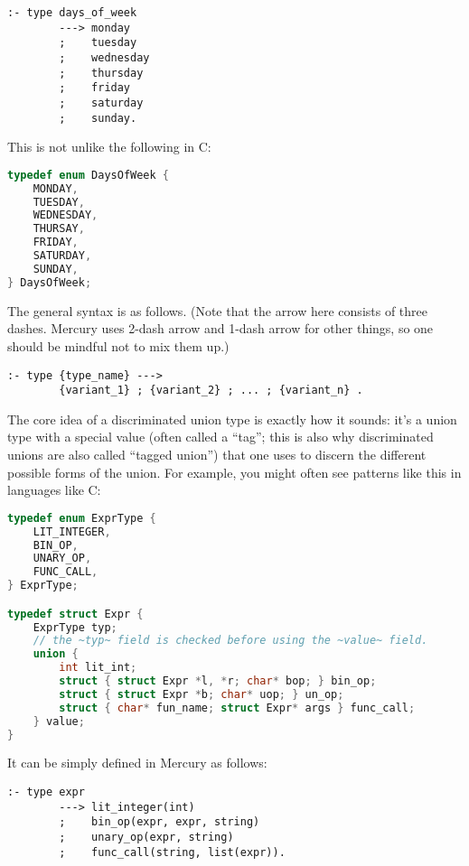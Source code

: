 \begin{lstlisting}[language=Mercury]
:- type days_of_week
        ---> monday
        ;    tuesday
        ;    wednesday
        ;    thursday
        ;    friday
        ;    saturday
        ;    sunday.
\end{lstlisting}

This is not unlike the following in C:

\begin{lstlisting}[language=C]
typedef enum DaysOfWeek {
    MONDAY,
    TUESDAY,
    WEDNESDAY,
    THURSAY,
    FRIDAY,
    SATURDAY,
    SUNDAY,
} DaysOfWeek;
\end{lstlisting}

  The general syntax is as follows. (Note that the arrow here consists of three dashes. Mercury uses 2-dash arrow and 1-dash arrow for other things, so one should be mindful not to mix them up.)
  
\begin{lstlisting}[language=Mercury]
:- type {type_name} --->
        {variant_1} ; {variant_2} ; ... ; {variant_n} .
\end{lstlisting}
  
The core idea of a discriminated union type is exactly how it sounds: it's a union type with a special value (often called a ``tag''; this is also why discriminated unions are also called ``tagged union'') that one uses to discern the different possible forms of the union. For example, you might often see patterns like this in languages like C:

\begin{lstlisting}[language=C]
typedef enum ExprType {
    LIT_INTEGER,
    BIN_OP,
    UNARY_OP,
    FUNC_CALL,
} ExprType;

typedef struct Expr {
    ExprType typ;
    // the ~typ~ field is checked before using the ~value~ field.
    union {
        int lit_int;
        struct { struct Expr *l, *r; char* bop; } bin_op;
        struct { struct Expr *b; char* uop; } un_op;
        struct { char* fun_name; struct Expr* args } func_call;
    } value;
}
\end{lstlisting}

  It can be simply defined in Mercury as follows:

\begin{lstlisting}[language=Mercury]
:- type expr
        ---> lit_integer(int)
        ;    bin_op(expr, expr, string)
        ;    unary_op(expr, string)
        ;    func_call(string, list(expr)).
\end{lstlisting}

